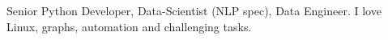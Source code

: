 

\begin{cvparagraph}

Senior Python Developer, Data-Scientist (NLP spec), Data Engineer. I love Linux, graphs, automation and challenging tasks.
\end{cvparagraph}

